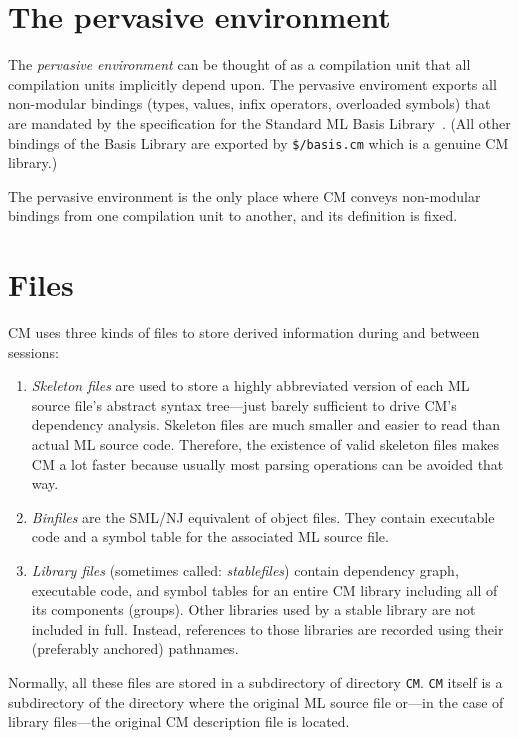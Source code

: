 \documentclass[titlepage,letterpaper]{article}
\begin{document}
\section{The pervasive environment}

The {\em pervasive environment} can be thought of as a compilation
unit that all compilation units implicitly depend upon.  The pervasive
enviroment exports all non-modular bindings (types, values, infix
operators, overloaded symbols) that are mandated by the specification
for the Standard ML Basis Library~\cite{reppy99:basis}.  (All other
bindings of the Basis Library are exported by {\tt \$/basis.cm} which is
a genuine CM library.)

The pervasive environment is the only place where CM conveys
non-modular bindings from one compilation unit to another, and its
definition is fixed.

\section{Files}
\label{sec:files}

CM uses three kinds of files to store derived information during and
between sessions:

\begin{enumerate}
\item {\it Skeleton files} are used to store a highly abbreviated
version of each ML source file's abstract syntax tree---just barely
sufficient to drive CM's dependency analysis.  Skeleton files are much
smaller and easier to read than actual ML source code.  Therefore, the
existence of valid skeleton files makes CM a lot faster because
usually most parsing operations can be avoided that way.
\item {\it Binfiles} are the SML/NJ equivalent of object files.  They
contain executable code and a symbol table for the associated ML
source file.
\item {\it Library files} (sometimes called: {\em stablefiles}) contain
dependency graph, executable code, and symbol tables for an entire CM
library including all of its components (groups).  Other libraries
used by a stable library are not included in full.  Instead,
references to those libraries are recorded using their (preferably
anchored) pathnames.
\end{enumerate}

Normally, all these files are stored in a subdirectory of directory
{\tt CM}. {\tt CM} itself is a subdirectory of the directory where the
original ML source file or---in the case of library files---the
original CM description file is located.
\end{document}
